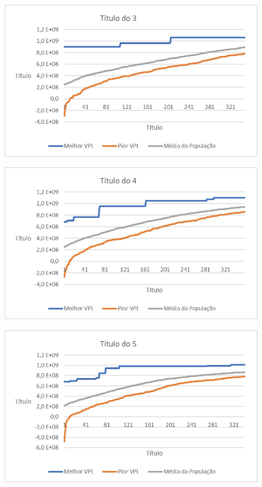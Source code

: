 \documentclass[12pt,a4paper]{report}
\begin{document}
\begin{figure}[H]
\centering

\includegraphics[scale=1]{AGRPCO1/3}

\end{figure}
\begin{figure}[H]
\centering

\includegraphics[scale=1]{AGRPCO1/4}

\end{figure}
\begin{figure}[H]
\centering

\includegraphics[scale=1]{AGRPCO1/5}

\end{figure}
\end{document}
